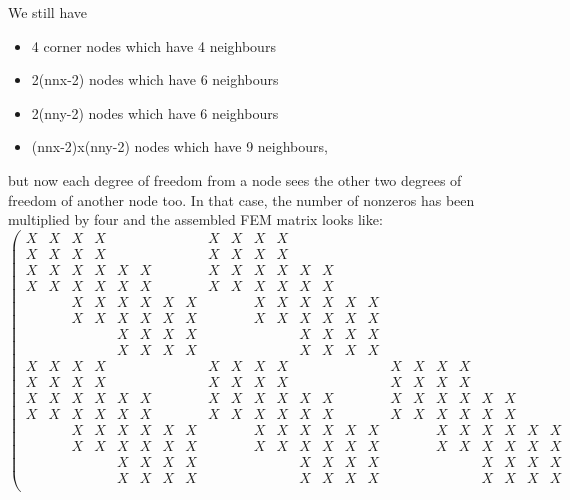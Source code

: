 We still have
\begin{itemize}
\item 4 corner nodes which have 4 neighbours
\item 2(nnx-2) nodes which have 6 neighbours
\item 2(nny-2) nodes which have 6 neighbours
\item (nnx-2)x(nny-2) nodes which have 9 neighbours,
\end{itemize}
but now each degree of freedom from a node sees the other two
degrees of freedom of another node too.
In that case, the number of nonzeros has been multiplied by four
and the assembled FEM matrix looks like:
\begin{equation}
\left(
\begin{array}{cccccccccccccccccccccccc}
X&X & X&X &  &  &  &  & X&X & X&X &  &  &  &  &  &  &  &  &  &  &  &  \\
X&X & X&X &  &  &  &  & X&X & X&X &  &  &  &  &  &  &  &  &  &  &  &  \\
X&X & X&X & X&X &  &  & X&X & X&X & X&X &  &  &  &  &  &  &  &  &  &  \\
X&X & X&X & X&X &  &  & X&X & X&X & X&X &  &  &  &  &  &  &  &  &  &  \\
 &  & X&X & X&X & X&X &  &  & X&X & X&X & X&X &  &  &  &  &  &  &  &  \\
 &  & X&X & X&X & X&X &  &  & X&X & X&X & X&X &  &  &  &  &  &  &  &  \\
 &  &  &  & X&X & X&X &  &  &  &  & X&X & X&X &  &  &  &  &  &  &  &  \\
 &  &  &  & X&X & X&X &  &  &  &  & X&X & X&X &  &  &  &  &  &  &  &  \\
X&X & X&X &  &  &  &  & X&X & X&X &  &  &  &  & X&X & X&X &  &  &  &  \\
X&X & X&X &  &  &  &  & X&X & X&X &  &  &  &  & X&X & X&X &  &  &  &  \\
X&X & X&X & X&X &  &  & X&X & X&X & X&X &  &  & X&X & X&X & X&X &  &  \\
X&X & X&X & X&X &  &  & X&X & X&X & X&X &  &  & X&X & X&X & X&X &  &  \\
 &  & X&X & X&X & X&X &  &  & X&X & X&X & X&X &  &  & X&X & X&X & X&X \\
 &  & X&X & X&X & X&X &  &  & X&X & X&X & X&X &  &  & X&X & X&X & X&X \\
 &  &  &  & X&X & X&X &  &  &  &  & X&X & X&X &  &  &  &  & X&X & X&X \\
 &  &  &  & X&X & X&X &  &  &  &  & X&X & X&X &  &  &  &  & X&X & X&X \\

\end{array}
\end{equation}
